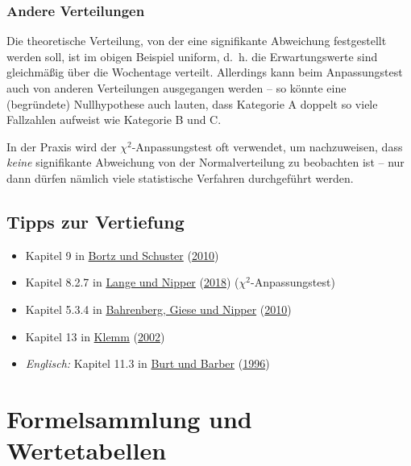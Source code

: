 \documentclass[
  11pt,
  ngerman,
  a4paper,
]{report}
\providecommand{\tightlist}{%
  \setlength{\itemsep}{0pt}\setlength{\parskip}{0pt}}
\begin{document}
\hypertarget{andere-verteilungen}{%
\subsection{Andere Verteilungen}\label{andere-verteilungen}}

Die theoretische Verteilung, von der eine signifikante Abweichung festgestellt werden soll, ist im obigen Beispiel uniform, d.~h. die Erwartungswerte sind gleichmäßig über die Wochentage verteilt.
Allerdings kann beim Anpassungstest auch von anderen Verteilungen ausgegangen werden -- so könnte eine (begründete) Nullhypothese auch lauten, dass Kategorie A doppelt so viele Fallzahlen aufweist wie Kategorie B und C.

In der Praxis wird der \(\chi^2\)-Anpassungstest oft verwendet, um nachzuweisen, dass \emph{keine} signifikante Abweichung von der Normalverteilung zu beobachten ist -- nur dann dürfen nämlich viele statistische Verfahren durchgeführt werden.

\hypertarget{tipps-zur-vertiefung-9}{%
\section*{Tipps zur Vertiefung}\label{tipps-zur-vertiefung-9}}

\begin{itemize}
\tightlist
\item
  Kapitel 9 in \protect\hyperlink{ref-bortz}{Bortz und Schuster} (\protect\hyperlink{ref-bortz}{2010})
\item
  Kapitel 8.2.7 in \protect\hyperlink{ref-delange}{Lange und Nipper} (\protect\hyperlink{ref-delange}{2018}) (\(\chi^2\)-Anpassungstest)
\item
  Kapitel 5.3.4 in \protect\hyperlink{ref-bahrenberg}{Bahrenberg, Giese und Nipper} (\protect\hyperlink{ref-bahrenberg}{2010})
\item
  Kapitel 13 in \protect\hyperlink{ref-klemm}{Klemm} (\protect\hyperlink{ref-klemm}{2002})
\item
  \emph{Englisch:} Kapitel 11.3 in \protect\hyperlink{ref-burt}{Burt und Barber} (\protect\hyperlink{ref-burt}{1996})
\end{itemize}

\hypertarget{formeln}{%
\chapter*{Formelsammlung und Wertetabellen}\label{formeln}}
\end{document}

